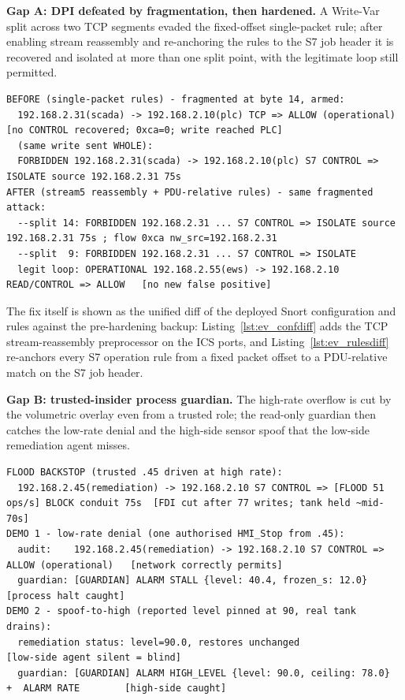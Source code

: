 \noindent\textbf{Gap A: DPI defeated by fragmentation, then hardened.} A Write-Var split across two TCP segments evaded the fixed-offset single-packet rule; after enabling stream reassembly and re-anchoring the rules to the S7 job header it is recovered and isolated at more than one split point, with the legitimate loop still permitted.
\begin{lstlisting}[style=carsdump,caption={Gap A: before (fragmented write evades) and after (caught), from the controller audit.},label={lst:ev_dpi}]
BEFORE (single-packet rules) - fragmented at byte 14, armed:
  192.168.2.31(scada) -> 192.168.2.10(plc) TCP => ALLOW (operational)   [no CONTROL recovered; 0xca=0; write reached PLC]
  (same write sent WHOLE):
  FORBIDDEN 192.168.2.31(scada) -> 192.168.2.10(plc) S7 CONTROL => ISOLATE source 192.168.2.31 75s
AFTER (stream5 reassembly + PDU-relative rules) - same fragmented attack:
  --split 14: FORBIDDEN 192.168.2.31 ... S7 CONTROL => ISOLATE source 192.168.2.31 75s ; flow 0xca nw_src=192.168.2.31
  --split  9: FORBIDDEN 192.168.2.31 ... S7 CONTROL => ISOLATE
  legit loop: OPERATIONAL 192.168.2.55(ews) -> 192.168.2.10 READ/CONTROL => ALLOW   [no new false positive]
\end{lstlisting}

The fix itself is shown as the unified diff of the deployed Snort configuration and rules against the pre-hardening backup: Listing~\ref{lst:ev_confdiff} adds the TCP stream-reassembly preprocessor on the ICS ports, and Listing~\ref{lst:ev_rulesdiff} re-anchors every S7 operation rule from a fixed packet offset to a PDU-relative match on the S7 job header.



\noindent\textbf{Gap B: trusted-insider process guardian.} The high-rate overflow is cut by the volumetric overlay even from a trusted role; the read-only guardian then catches the low-rate denial and the high-side sensor spoof that the low-side remediation agent misses.
\begin{lstlisting}[style=carsdump,caption={Gap B: the flood backstop and the two guardian alarms.},label={lst:ev_guardian}]
FLOOD BACKSTOP (trusted .45 driven at high rate):
  192.168.2.45(remediation) -> 192.168.2.10 S7 CONTROL => [FLOOD 51 ops/s] BLOCK conduit 75s  [FDI cut after 77 writes; tank held ~mid-70s]
DEMO 1 - low-rate denial (one authorised HMI_Stop from .45):
  audit:    192.168.2.45(remediation) -> 192.168.2.10 S7 CONTROL => ALLOW (operational)   [network correctly permits]
  guardian: [GUARDIAN] ALARM STALL {level: 40.4, frozen_s: 12.0}                          [process halt caught]
DEMO 2 - spoof-to-high (reported level pinned at 90, real tank drains):
  remediation status: level=90.0, restores unchanged                                      [low-side agent silent = blind]
  guardian: [GUARDIAN] ALARM HIGH_LEVEL {level: 90.0, ceiling: 78.0}  +  ALARM RATE        [high-side caught]
\end{lstlisting}


